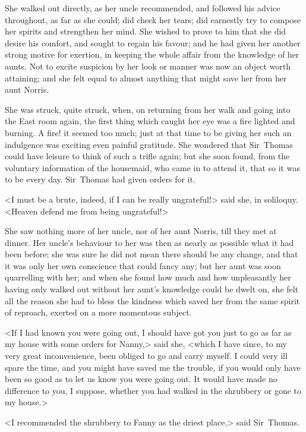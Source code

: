She walked out directly, as her uncle recommended, and followed his advice throughout, as far as she could; did check her tears; did earnestly try to compose her spirits and strengthen her mind. She wished to prove to him that she did desire his comfort, and sought to regain his favour; and he had given her another strong motive for exertion, in keeping the whole affair from the knowledge of her aunts. Not to excite suspicion by her look or manner was now an object worth attaining; and she felt equal to almost anything that might save her from her aunt Norris.

She was struck, quite struck, when, on returning from her walk and going into the East room again, the first thing which caught her eye was a fire lighted and burning. A fire! it seemed too much; just at that time to be giving her such an indulgence was exciting even painful gratitude. She wondered that Sir~Thomas could have leisure to think of such a trifle again; but she soon found, from the voluntary information of the housemaid, who came in to attend it, that so it was to be every day. Sir~Thomas had given orders for it.

<I must be a brute, indeed, if I can be really ungrateful!> said she, in soliloquy. <Heaven defend me from being ungrateful!>

She saw nothing more of her uncle, nor of her aunt Norris, till they met at dinner. Her uncle's behaviour to her was then as nearly as possible what it had been before; she was sure he did not mean there should be any change, and that it was only her own conscience that could fancy any; but her aunt was soon quarrelling with her; and when she found how much and how unpleasantly her having only walked out without her aunt's knowledge could be dwelt on, she felt all the reason she had to bless the kindness which saved her from the same spirit of reproach, exerted on a more momentous subject.

<If I had known you were going out, I should have got you just to go as far as my house with some orders for Nanny,> said she, <which I have since, to my very great inconvenience, been obliged to go and carry myself. I could very ill spare the time, and you might have saved me the trouble, if you would only have been so good as to let us know you were going out. It would have made no difference to you, I suppose, whether you had walked in the shrubbery or gone to my house.>

<I recommended the shrubbery to Fanny as the driest place,> said Sir~Thomas.

